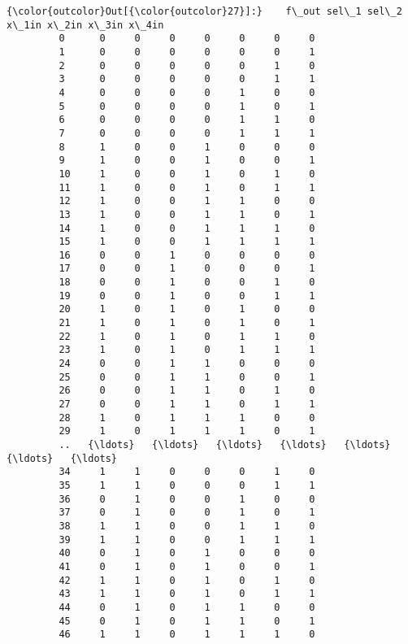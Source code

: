 \documentclass[11pt]{article}
\begin{document}
\begin{Verbatim}[commandchars=\\\{\}]
{\color{outcolor}Out[{\color{outcolor}27}]:}    f\_out sel\_1 sel\_2 x\_1in x\_2in x\_3in x\_4in
         0      0     0     0     0     0     0     0
         1      0     0     0     0     0     0     1
         2      0     0     0     0     0     1     0
         3      0     0     0     0     0     1     1
         4      0     0     0     0     1     0     0
         5      0     0     0     0     1     0     1
         6      0     0     0     0     1     1     0
         7      0     0     0     0     1     1     1
         8      1     0     0     1     0     0     0
         9      1     0     0     1     0     0     1
         10     1     0     0     1     0     1     0
         11     1     0     0     1     0     1     1
         12     1     0     0     1     1     0     0
         13     1     0     0     1     1     0     1
         14     1     0     0     1     1     1     0
         15     1     0     0     1     1     1     1
         16     0     0     1     0     0     0     0
         17     0     0     1     0     0     0     1
         18     0     0     1     0     0     1     0
         19     0     0     1     0     0     1     1
         20     1     0     1     0     1     0     0
         21     1     0     1     0     1     0     1
         22     1     0     1     0     1     1     0
         23     1     0     1     0     1     1     1
         24     0     0     1     1     0     0     0
         25     0     0     1     1     0     0     1
         26     0     0     1     1     0     1     0
         27     0     0     1     1     0     1     1
         28     1     0     1     1     1     0     0
         29     1     0     1     1     1     0     1
         ..   {\ldots}   {\ldots}   {\ldots}   {\ldots}   {\ldots}   {\ldots}   {\ldots}
         34     1     1     0     0     0     1     0
         35     1     1     0     0     0     1     1
         36     0     1     0     0     1     0     0
         37     0     1     0     0     1     0     1
         38     1     1     0     0     1     1     0
         39     1     1     0     0     1     1     1
         40     0     1     0     1     0     0     0
         41     0     1     0     1     0     0     1
         42     1     1     0     1     0     1     0
         43     1     1     0     1     0     1     1
         44     0     1     0     1     1     0     0
         45     0     1     0     1     1     0     1
         46     1     1     0     1     1     1     0

\end{Verbatim}
\end{document}
